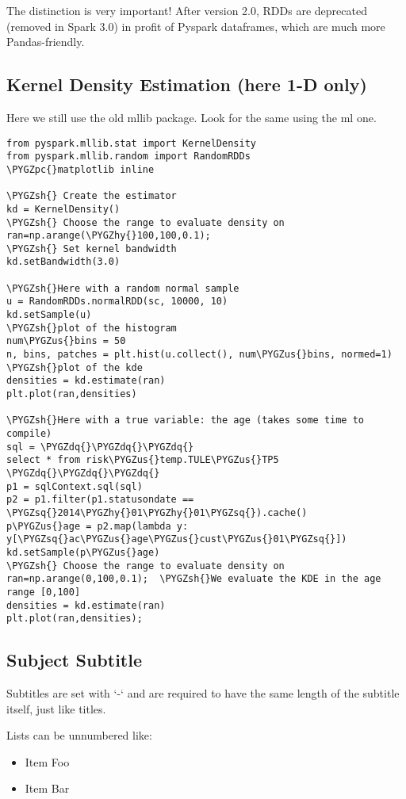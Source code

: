 \documentclass[letterpaper,10pt,english]{sphinxmanual}
\def\PYGZus{\char`\_}
\def\PYGZsh{\char`\#}
\def\PYGZpc{\char`\%}
\def\PYGZhy{\char`\-}
\def\PYGZsq{\char`\'}
\def\PYGZdq{\char`\"}
\renewcommand\PYGZsq{\textquotesingle}
\begin{document}
The distinction is very important! After version 2.0, RDDs are deprecated (removed in Spark 3.0) in profit of Pyspark dataframes, which are much more Pandas-friendly.


\subsection{Kernel Density Estimation (here 1-D only)}
\label{Pyspark_Documentation:kernel-density-estimation-here-1-d-only}
Here we still use the old mllib package. Look for the same using the ml one.

\begin{Verbatim}[commandchars=\\\{\}]
from pyspark.mllib.stat import KernelDensity
from pyspark.mllib.random import RandomRDDs
\PYGZpc{}matplotlib inline

\PYGZsh{} Create the estimator
kd = KernelDensity()
\PYGZsh{} Choose the range to evaluate density on
ran=np.arange(\PYGZhy{}100,100,0.1);
\PYGZsh{} Set kernel bandwidth
kd.setBandwidth(3.0)

\PYGZsh{}Here with a random normal sample
u = RandomRDDs.normalRDD(sc, 10000, 10)
kd.setSample(u)
\PYGZsh{}plot of the histogram
num\PYGZus{}bins = 50
n, bins, patches = plt.hist(u.collect(), num\PYGZus{}bins, normed=1)
\PYGZsh{}plot of the kde
densities = kd.estimate(ran)
plt.plot(ran,densities)

\PYGZsh{}Here with a true variable: the age (takes some time to compile)
sql = \PYGZdq{}\PYGZdq{}\PYGZdq{}
select * from risk\PYGZus{}temp.TULE\PYGZus{}TP5
\PYGZdq{}\PYGZdq{}\PYGZdq{}
p1 = sqlContext.sql(sql)
p2 = p1.filter(p1.statusondate == \PYGZsq{}2014\PYGZhy{}01\PYGZhy{}01\PYGZsq{}).cache()
p\PYGZus{}age = p2.map(lambda y: y[\PYGZsq{}ac\PYGZus{}age\PYGZus{}cust\PYGZus{}01\PYGZsq{}])
kd.setSample(p\PYGZus{}age)
\PYGZsh{} Choose the range to evaluate density on
ran=np.arange(0,100,0.1);  \PYGZsh{}We evaluate the KDE in the age range [0,100]
densities = kd.estimate(ran)
plt.plot(ran,densities);
\end{Verbatim}


\subsection{Subject Subtitle}
\label{Pyspark_Documentation:subject-subtitle}
Subtitles are set with `-` and are required to have the same length
of the subtitle itself, just like titles.

Lists can be unnumbered like:
\begin{itemize}
\item {} 
Item Foo

\item {} 
Item Bar

\end{itemize}
\end{document}
